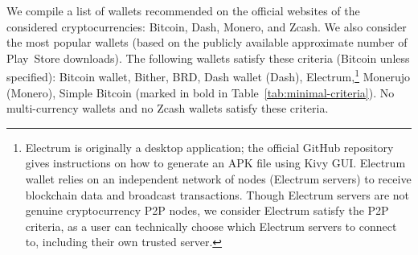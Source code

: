 We compile a list of wallets recommended on the official websites of the considered cryptocurrencies: Bitcoin, Dash, Monero, and Zcash.
We also consider the most popular wallets (based on the publicly available approximate number of Play~Store downloads).
The following wallets satisfy these criteria (Bitcoin unless specified): Bitcoin wallet, Bither, BRD, Dash wallet (Dash), Electrum,\footnote{Electrum is originally a desktop application; the official GitHub repository gives instructions on how to generate an APK file using Kivy GUI\@. Electrum wallet relies on an independent network of nodes (Electrum servers) to receive blockchain data and broadcast transactions. Though Electrum servers are not genuine cryptocurrency P2P nodes, we consider Electrum satisfy the P2P criteria, as a user can technically choose which Electrum servers to connect to, including their own trusted server.} Monerujo (Monero), Simple Bitcoin (marked in bold in Table~\ref{tab:minimal-criteria}).
No multi-currency wallets and no Zcash wallets satisfy these criteria.

